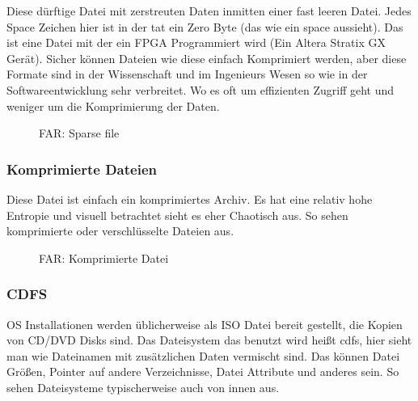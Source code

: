 Diese dürftige Datei mit zerstreuten Daten inmitten einer fast leeren Datei.
Jedes Space Zeichen hier ist in der tat ein Zero Byte (das wie ein space aussieht). %
Das ist eine Datei mit der ein FPGA Programmiert wird (Ein Altera Stratix GX Gerät).
Sicher können Dateien wie diese einfach Komprimiert werden, aber diese Formate sind in 
der Wissenschaft und im Ingenieurs Wesen so wie in der Softwareentwicklung sehr verbreitet.
Wo es oft um effizienten Zugriff geht und weniger um die Komprimierung der Daten.


\begin{figure}[H]
\centering
{}
\caption{FAR: Sparse file}
\end{figure}

\clearpage
\subsubsection{Komprimierte Dateien}

Diese Datei ist einfach ein komprimiertes Archiv. 
Es hat eine relativ hohe Entropie und visuell betrachtet sieht es 
eher Chaotisch aus. So sehen komprimierte oder verschlüsselte Dateien aus.

\begin{figure}[H]
\centering
{}
\caption{FAR: Komprimierte Datei}
\end{figure}

\clearpage
\subsubsection{\ac{CDFS}}

\ac{OS} Installationen werden üblicherweise als ISO Datei bereit gestellt, die Kopien von CD/DVD Disks sind. 
Das Dateisystem das benutzt wird heißt \ac{cdfs}, hier sieht man wie Dateinamen mit zusätzlichen Daten vermischt sind.
Das können Datei Größen, Pointer auf andere Verzeichnisse, Datei Attribute und anderes sein. 
So sehen Dateisysteme typischerweise auch von innen aus.

